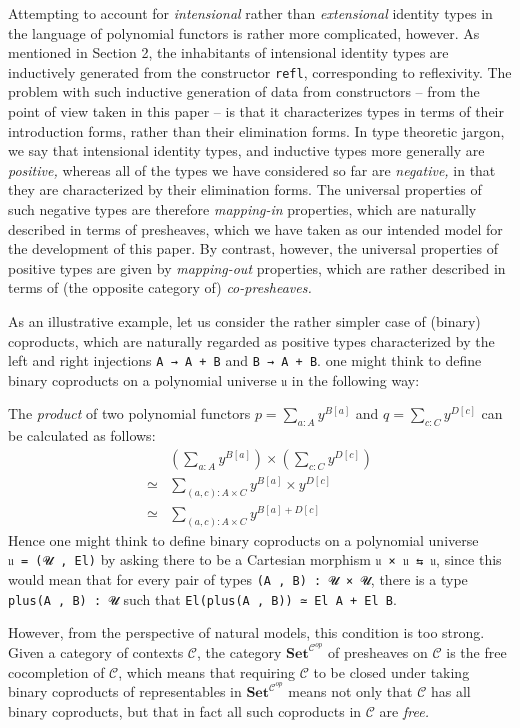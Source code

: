 \documentclass[
  11pt,
  oneside,
  article]{memoir}
\theoremstyle{definition}
\theoremstyle{plain}
\newcommand{\0}{\textsf{0}}
\newcommand{\1}{\tn{\textsf{1}}}
\begin{document}
Attempting to account for \emph{intensional} rather than
\emph{extensional} identity types in the language of polynomial functors
is rather more complicated, however. As mentioned in Section 2, the
inhabitants of intensional identity types are inductively generated from
the constructor \texttt{refl}, corresponding to reflexivity. The problem
with such inductive generation of data from constructors -- from the
point of view taken in this paper -- is that it characterizes types in
terms of their introduction forms, rather than their elimination forms.
In type theoretic jargon, we say that intensional identity types, and
inductive types more generally are \emph{positive,} whereas all of the
types we have considered so far are \emph{negative,} in that they are
characterized by their elimination forms. The universal properties of
such negative types are therefore \emph{mapping-in} properties, which
are naturally described in terms of presheaves, which we have taken as
our intended model for the development of this paper. By contrast,
however, the universal properties of positive types are given by
\emph{mapping-out} properties, which are rather described in terms of
(the opposite category of) \emph{co-presheaves.}

As an illustrative example, let us consider the rather simpler case of
(binary) coproducts, which are naturally regarded as positive types
characterized by the left and right injections \texttt{A\ →\ A\ +\ B}
and \texttt{B\ →\ A\ +\ B}. one might think to define binary coproducts
on a polynomial universe \texttt{𝔲} in the following way:

The \emph{product} of two polynomial functors
\(p = \sum_{a : A} y^{B[a]}\) and \(q = \sum_{c : C} y^{D[c]}\) can be
calculated as follows: \[
\begin{array}{rl} & \left( \sum_{a : A} y^{B[a]} \right) \times \left( \sum_{c : C} y^{D[c]} \right)\\
\simeq & \sum_{(a , c) : A \times C} y^{B[a]} \times y^{D[c]}\\
\simeq & \sum_{(a , c) : A \times C} y^{B[a] + D[c]}
\end{array}
\] Hence one might think to define binary coproducts on a polynomial
universe \texttt{𝔲\ =\ (𝓤\ ,\ El)} by asking there to be a Cartesian
morphism \texttt{𝔲\ ×\ 𝔲\ ⇆\ 𝔲}, since this would mean that for every
pair of types \texttt{(A\ ,\ B)\ :\ 𝓤\ ×\ 𝓤}, there is a type
\texttt{plus(A\ ,\ B)\ :\ 𝓤} such that
\texttt{El(plus(A\ ,\ B))\ ≃\ El\ A\ +\ El\ B}.

However, from the perspective of natural models, this condition is too
strong. Given a category of contexts \(\mathcal{C}\), the category
\(\mathbf{Set}^{\mathcal{C}^{op}}\) of presheaves on \(\mathcal{C}\) is
the free cocompletion of \(\mathcal{C}\), which means that requiring
\(\mathcal{C}\) to be closed under taking binary coproducts of
representables in \(\mathbf{Set}^{\mathcal{C}^{op}}\) means not only
that \(\mathcal{C}\) has all binary coproducts, but that in fact all
such coproducts in \(\mathcal{C}\) are \emph{free.}
\end{document}
